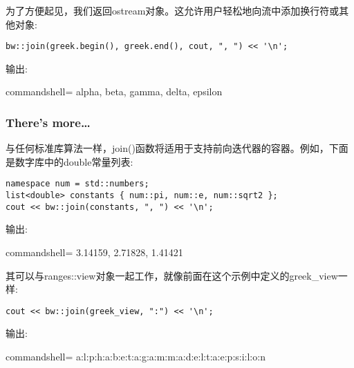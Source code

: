 为了方便起见，我们返回ostream对象。这允许用户轻松地向流中添加换行符或其他对象:

\begin{lstlisting}[style=styleCXX]
bw::join(greek.begin(), greek.end(), cout, ", ") << '\n';
\end{lstlisting}

输出:

\begin{tcblisting}{commandshell={}}
alpha, beta, gamma, delta, epsilon
\end{tcblisting}

\subsubsection{There's more…}

与任何标准库算法一样，join()函数将适用于支持前向迭代器的容器。例如，下面是数字库中的double常量列表:

\begin{lstlisting}[style=styleCXX]
namespace num = std::numbers;
list<double> constants { num::pi, num::e, num::sqrt2 };
cout << bw::join(constants, ", ") << '\n';
\end{lstlisting}

输出:

\begin{tcblisting}{commandshell={}}
3.14159, 2.71828, 1.41421
\end{tcblisting}

其可以与ranges::view对象一起工作，就像前面在这个示例中定义的greek\_view一样:

\begin{lstlisting}[style=styleCXX]
cout << bw::join(greek_view, ":") << '\n';
\end{lstlisting}

输出:

\begin{tcblisting}{commandshell={}}
a:l:p:h:a:b:e:t:a:g:a:m:m:a:d:e:l:t:a:e:p:s:i:l:o:n
\end{tcblisting}

